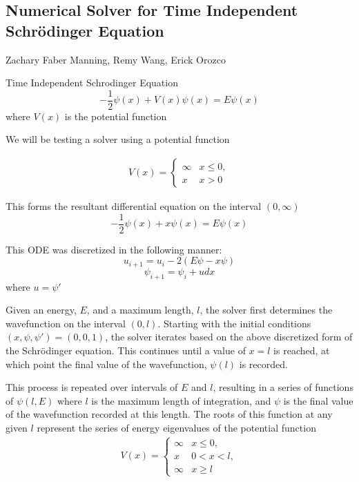 \documentclass[12pt]{article}
\begin{document}
\begin{center}
\section*{Numerical Solver for Time Independent Schr\"odinger Equation}
Zachary Faber Manning, Remy Wang, Erick Orozco
\end{center}

Time Independent Schrodinger Equation
\begin{equation}
-\frac{1}{2}\psi(x) + V(x)\psi(x) = E\psi(x)
\end{equation}
where $V(x)$ is the potential function

\bigbreak
We will be testing a solver using a potential function

\begin{equation}
\begin{array}{ll}
V(x) = 
\begin{cases}
\infty & x \leq 0 ,\\
x & x > 0
\end{cases}
\end{array}
\end{equation}

\bigbreak
This forms the resultant differential equation on the interval $(0, \infty)$
\begin{equation}
-\frac{1}{2}\psi(x) + x\psi(x) = E\psi(x)
\end{equation}

This ODE was discretized in the following manner:
\begin{equation}
u_{i+1} = u_i - 2(E\psi - x\psi)
\end{equation}
\begin{equation}
\psi_{i+1} = \psi_i + udx
\end{equation}
where $u=\psi'$

\bigbreak

Given an energy, $E$, and a maximum length, $l$, the solver first determines the wavefunction on the interval $(0,l)$. Starting with the initial conditions $(x, \psi, \psi') = (0, 0, 1)$, the solver iterates based on the above discretized form of the Schr\"odinger equation. This continues until a value of $x = l$ is reached, at which point the final value of the wavefunction, $\psi(l)$ is recorded.

\bigbreak

This process is repeated over intervals of $E$ and $l$, resulting in a series of functions of $\psi(l, E)$ where $l$ is the maximum length of integration, and $\psi$ is the final value of the wavefunction recorded at this length. The roots of this function at any given $l$ represent the series of energy eigenvalues of the potential function
\begin{equation}
\begin{array}{ll}
V(x) = 
\begin{cases}
\infty & x \leq 0 ,\\
x & 0 < x < l,\\
\infty & x \geq l
\end{cases}
\end{array}
\end{equation}
\end{document}
